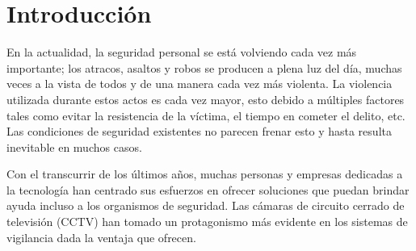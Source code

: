 \documentclass[a4paper,12pt,oneside,spanish]{book}
\begin{document}
\section{Introducción}
En la actualidad, la seguridad personal se está volviendo cada vez más importante; los atracos, asaltos y robos se producen a plena luz del día, muchas veces a la vista de todos y de una manera cada vez más violenta. La violencia utilizada durante estos actos es cada vez mayor, esto debido a múltiples factores tales como evitar la resistencia de la víctima, el tiempo en cometer el delito, etc. Las condiciones de seguridad existentes no parecen frenar esto y hasta resulta inevitable en muchos casos. \par

Con el transcurrir de los últimos años, muchas personas y empresas dedicadas a la tecnología han centrado sus esfuerzos en ofrecer soluciones que puedan brindar ayuda incluso a los organismos de seguridad. Las cámaras de circuito cerrado de televisión (CCTV) han tomado un protagonismo más evidente en los sistemas de vigilancia dada la ventaja que ofrecen. \par
\end{document}
